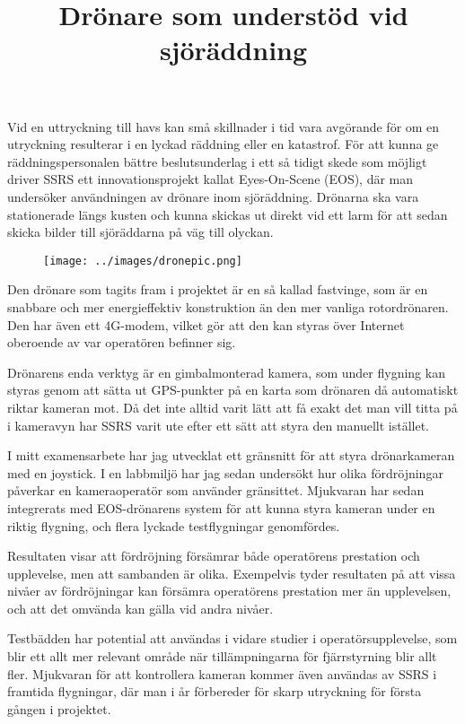 \documentclass{popsci}
\title{Drönare som understöd vid sjöräddning}
\begin{document}

{\noindent Vid en uttryckning till havs kan små skillnader i tid vara avgörande för om en utryckning resulterar i en lyckad räddning eller en katastrof. För att kunna ge räddningspersonalen bättre beslutsunderlag i ett så tidigt skede som möjligt driver SSRS ett innovationsprojekt kallat Eyes-On-Scene (EOS), där man undersöker användningen av drönare inom sjöräddning. Drönarna ska vara stationerade längs kusten och kunna skickas ut direkt vid ett larm för att sedan skicka bilder till sjöräddarna på väg till olyckan.

\begin{figure}[!bth] %
    \texttt{[image: ../images/dronepic.png]} 
\end{figure}

Den drönare som tagits fram i projektet är en så kallad fastvinge, som är en snabbare och mer energieffektiv konstruktion än den mer vanliga rotordrönaren. Den har även ett 4G-modem, vilket gör att den kan styras över Internet oberoende av var operatören befinner sig. 

Drönarens enda verktyg är en gimbalmonterad kamera, som under flygning kan styras genom att sätta ut GPS-punkter på en karta som drönaren då automatiskt riktar kameran mot. Då det inte alltid varit lätt att få exakt det man vill titta på i kameravyn har SSRS varit ute efter ett sätt att styra den manuellt istället.

I mitt examensarbete har jag utvecklat ett gränsnitt för att styra drönarkameran med en joystick. I en labbmiljö har jag sedan undersökt hur olika fördröjningar påverkar en kameraoperatör som använder gränsittet. Mjukvaran har sedan integrerats med EOS-drönarens system för att kunna styra kameran under en riktig flygning, och flera lyckade testflygningar genomfördes. 

Resultaten visar att fördröjning försämrar både operatörens prestation och upplevelse, men att sambanden är olika. Exempelvis tyder resultaten på att vissa nivåer av fördröjningar kan försämra operatörens prestation mer än upplevelsen, och att det omvända kan gälla vid andra nivåer.

Testbädden har potential att användas i vidare studier i operatörsupplevelse, som blir ett allt mer relevant område när tillämpningarna för fjärrstyrning blir allt fler. Mjukvaran för att kontrollera kameran kommer även användas av SSRS i framtida flygningar, där man i år förbereder för skarp utryckning för första gången i projektet.
}
\end{document}
